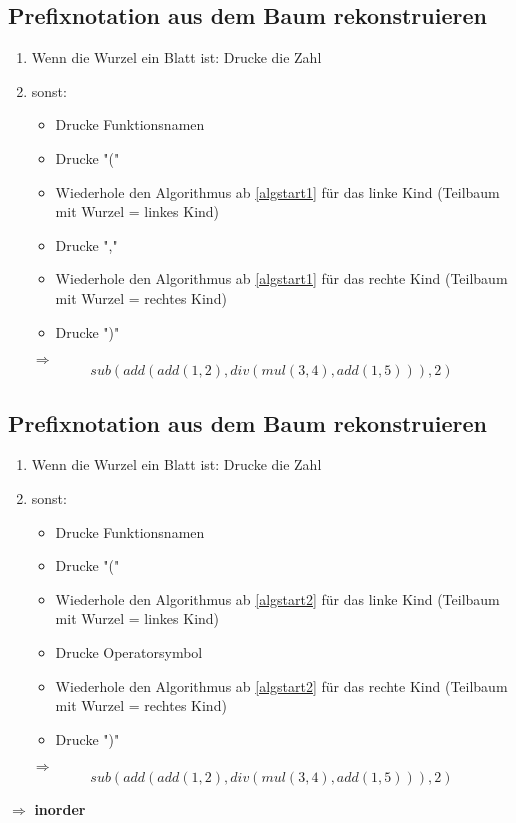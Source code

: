 \documentclass[a4paper]{scrartcl}
\begin{document}
\subsection{Prefixnotation aus dem Baum rekonstruieren}
\label{sec-5-4}
\begin{enumerate}
\item \label{algstart1} Wenn die Wurzel ein Blatt ist: Drucke die Zahl
\item sonst:
\begin{itemize}
\item Drucke Funktionsnamen
\item Drucke "("
\item Wiederhole den Algorithmus ab \ref{algstart1} für das linke Kind (Teilbaum mit Wurzel = linkes Kind)
\item Drucke ","
\item Wiederhole den Algorithmus ab \ref{algstart1} für das rechte Kind (Teilbaum mit Wurzel = rechtes Kind)
\item Drucke ")"
\end{itemize}
$\Rightarrow$ \[sub(add(add(1,2),div(mul(3,4),add(1,5))), 2)\]
\end{enumerate}
\subsection{Prefixnotation aus dem Baum rekonstruieren}
\label{sec-5-5}
\begin{enumerate}
\item \label{algstart2} Wenn die Wurzel ein Blatt ist: Drucke die Zahl
\item sonst:
\begin{itemize}
\item Drucke Funktionsnamen
\item Drucke "("
\item Wiederhole den Algorithmus ab \ref{algstart2} für das linke Kind (Teilbaum mit Wurzel = linkes Kind)
\item Drucke Operatorsymbol
\item Wiederhole den Algorithmus ab \ref{algstart2} für das rechte Kind (Teilbaum mit Wurzel = rechtes Kind)
\item Drucke ")"
\end{itemize}
$\Rightarrow$ \[sub(add(add(1,2),div(mul(3,4),add(1,5))), 2)\]
\end{enumerate}
$\Rightarrow$ \textbf{inorder}
\end{document}
